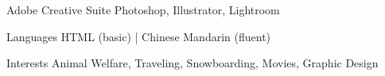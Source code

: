 

\begin{cvskills}
  \cvskill
    {Adobe Creative Suite} %
    {Photoshop, Illustrator, Lightroom} %
\end{cvskills}

\begin{cvskills}
  \cvskill
    {Languages} %
    {HTML (basic) | Chinese Mandarin (fluent)} %
\end{cvskills}

\begin{cvskills}
  \cvskill
    {Interests} %
    {Animal Welfare, Traveling, Snowboarding, Movies, Graphic Design} %
\end{cvskills}

